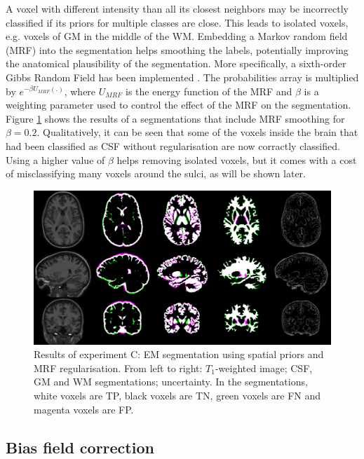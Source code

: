 A voxel with different intensity than all its closest neighbors may be incorrectly classified if its priors for multiple classes are close. This leads to isolated voxels, e.g. voxels of GM in the middle of the WM. Embedding a Markov random field (MRF) into the segmentation helps smoothing the labels, potentially improving the anatomical plausibility of the segmentation. More specifically, a sixth-order Gibbs Random Field has been implemented \cite{leemput_automated_1999-1}. The probabilities array is multiplied by $e^{- \beta U_{MRF}(.)}$, where $U_{MRF}$ is the energy function of the MRF and $\beta$ is a weighting parameter used to control the effect of the MRF on the segmentation. Figure \ref{fig:experiment-c} shows the results of a segmentations that include MRF smoothing for $\beta = 0.2$. Qualitatively, it can be seen that some of the voxels inside the brain that had been classified as CSF without regularisation are now corractly classified. Using a higher value of $\beta$ helps removing isolated voxels, but it comes with a cost of misclassifying many voxels around the sulci, as will be shown later.

\begin{figure}
  \centering
  \includegraphics[width=\textwidth]{figures/experiment_b}
  \caption{Results of experiment C: EM segmentation using spatial priors and MRF regularisation. From left to right: $T_1$-weighted image; CSF, GM and WM segmentations; uncertainty. In the segmentations, white voxels are TP, black voxels are TN, green voxels are FN and magenta voxels are FP.}
  \label{fig:experiment-c}
\end{figure}



\subsection{Bias field correction}

